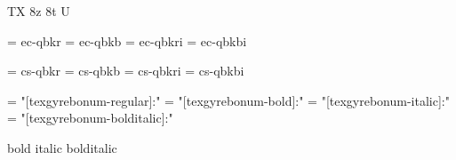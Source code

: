 
\ifx\ffdecl\undefined  \fi

\ffdecl [TG Bonum] {\caps} {\rm \bf \it \bi} {} {TX} {8z 8t U}

\def\caps{\ffsetV{caps}{-sc}\ffsetX}  \def\nocaps{\ffsetV{caps}{}\ffsetX}
\def\capsV{} 

\ismacro{}\ifttrue

   \font\tenrm = ec-qbkr  \sizespec
   \font\tenbf = ec-qbkb  \sizespec
   \font\tenit = ec-qbkri \sizespec
   \font\tenbi = ec-qbkbi \sizespec

   \def\ffnamegen{ec-qbk\ffvarV\capsV}

\fi

\ismacro{}\iftrue

   \font\tenrm = cs-qbkr  \sizespec
   \font\tenbf = cs-qbkb  \sizespec
   \font\tenit = cs-qbkri \sizespec
   \font\tenbi = cs-qbkbi \sizespec

   \def\ffnamegen{cs-qbk\ffvarV\capsV}
   

\fi

\ismacro{}\iftrue

   \font\tenrm = "[texgyrebonum-regular]:\fontfeatures"    \sizespec
   \font\tenbf = "[texgyrebonum-bold]:\fontfeatures"       \sizespec
   \font\tenit = "[texgyrebonum-italic]:\fontfeatures"     \sizespec
   \font\tenbi = "[texgyrebonum-bolditalic]:\fontfeatures" \sizespec

   \def\ffnamegen{"[texgyrebonum-\ffvarV]:\capsV\fontfeatures"} 

    {bold} {italic} {bolditalic}
   \def\caps{\ffsetV{caps}{+smcp;}\ffsetX}

\fi
\tenrm %

\ifx\loadmathfonts\relax \endinput \fi
\ifx\mathpreloaded X\else  \fi                     

\endinput
